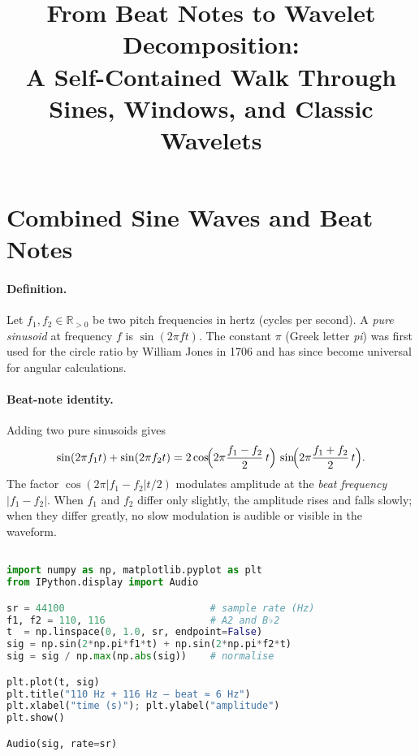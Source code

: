 \documentclass[11pt]{article}
\title{From Beat Notes to Wavelet Decomposition:\\
A Self-Contained Walk Through Sines, Windows, and Classic Wavelets}
\author{}
\date{}
\begin{document}
\maketitle

\tableofcontents
\bigskip

\section{Combined Sine Waves and Beat Notes}

\paragraph{Definition.}
Let \(f_1, f_2 \in \mathbb{R}_{>0}\) be two pitch frequencies in hertz (cycles per second).
A \emph{pure sinusoid} at frequency \(f\) is \( \sin(2\pi f t) \).
The constant \( \pi \) (Greek letter \emph{pi}) was first used for the circle ratio by
William Jones in 1706 and has since become universal for angular calculations.

\paragraph{Beat-note identity.}
Adding two pure sinusoids gives
\[
\sin(2\pi f_1 t) + \sin(2\pi f_2 t)
     = 2 \cos\!\Bigl(2\pi \frac{f_1 - f_2}{2}\, t\Bigr)\,
       \sin\!\Bigl(2\pi \frac{f_1 + f_2}{2}\, t\Bigr).
\]
The factor \( \cos(2\pi |f_1-f_2|t/2) \) modulates amplitude at the
\emph{beat frequency} \( |f_1 - f_2| \).  When \( f_1 \) and \( f_2 \) differ only
slightly, the amplitude rises and falls slowly; when they differ greatly,
no slow modulation is audible or visible in the waveform.

\begin{lstlisting}[language=Python,caption={One-second beat note at 110 Hz and 116 Hz}]

import numpy as np, matplotlib.pyplot as plt
from IPython.display import Audio

sr = 44100                         # sample rate (Hz)
f1, f2 = 110, 116                  # A2 and B♭2
t  = np.linspace(0, 1.0, sr, endpoint=False)
sig = np.sin(2*np.pi*f1*t) + np.sin(2*np.pi*f2*t)
sig = sig / np.max(np.abs(sig))    # normalise

plt.plot(t, sig)
plt.title("110 Hz + 116 Hz — beat ≈ 6 Hz")
plt.xlabel("time (s)"); plt.ylabel("amplitude")
plt.show()

Audio(sig, rate=sr)
\end{lstlisting}
\end{document}
